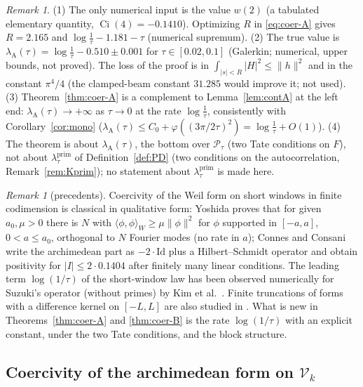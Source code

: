 \documentclass[11pt]{amsart}
\theoremstyle{definition}
\theoremstyle{remark}
\newtheorem{remark}[theorem]{Remark}
\begin{document}
\begin{remark}\label{rem:coer-A}
(1) The only numerical input is the value $w(2)$ (a tabulated elementary quantity, $\operatorname{Ci}(4)=-0.1410$).
Optimizing $R$ in \eqref{eq:coer-A} gives $R=2.165$ and $\log\frac1\tau-1.181-\tau$ (numerical
supremum). (2) The true value is $\lambda_{\mathrm A}(\tau)=\log\frac1\tau-0.510\pm0.001$ for $\tau\in[0.02,0.1]$
(Galerkin; numerical, upper bounds, not proved). The loss of the proof is in
$\int_{|s|<R}|H|^2\le\|h\|^2$ and in the constant $\pi^4/4$ (the clamped-beam constant $31.285$ would
improve it; not used). (3) Theorem~\ref{thm:coer-A} is a complement to Lemma~\ref{lem:contA} at the
left end: $\lambda_{\mathrm A}(\tau)\to+\infty$ as $\tau\to0$ at the rate $\log\frac1\tau$, consistently with
Corollary~\ref{cor:mono} ($\lambda_{\mathrm A}(\tau)\le C_0+\varphi((3\pi/2\tau)^2)=\log\frac1\tau+O(1)$).
(4) The theorem is about $\lambda_{\mathrm A}(\tau)$, the bottom over $\mathcal P_\tau$ (two Tate conditions
on $F$), not about $\lambda^{\mathrm{prim}}_\tau$ of Definition~\ref{def:PD} (two conditions on the autocorrelation,
Remark~\ref{rem:Kprim}); no statement about $\lambda^{\mathrm{prim}}_\tau$ is made here.
\end{remark}

\begin{remark}[precedents]\label{rem:coer-prec}
Coercivity of the Weil form on short windows in finite codimension is classical in qualitative form:
Yoshida \cite[Lemma~3]{Yoshida1992} proves that for given $a_0,\mu>0$ there is $N$ with $\langle\phi,\phi\rangle_W\ge\mu\|\phi\|^2$
for $\phi$ supported in $[-a,a]$, $0<a\le a_0$, orthogonal to $N$ Fourier modes (no rate in $a$); Connes and Consani
\cite[Thm.~3.6, Cor.~3.8, Rem.~3.9]{ConnesConsani2021} write the archimedean part as $-2\cdot\mathrm{Id}$ plus a
Hilbert--Schmidt operator and obtain positivity for $|I|\le2\cdot0.1404$ after finitely many linear conditions.
The leading term $\log(1/\tau)$ of the short-window law has been observed numerically for Suzuki's operator (without
primes) by Kim et al.\ \cite{Kim2026}. Finite truncations of forms with a difference kernel on $[-L,L]$ are also studied
in \cite{CvS2025}. What is new in Theorems~\ref{thm:coer-A} and \ref{thm:coer-B} is the rate $\log(1/\tau)$ with an
explicit constant, under the two Tate conditions, and the block structure.
\end{remark}

\subsection{Coercivity of the archimedean form on $\mathcal V_k$}\label{subsec:coer-B}
\end{document}
